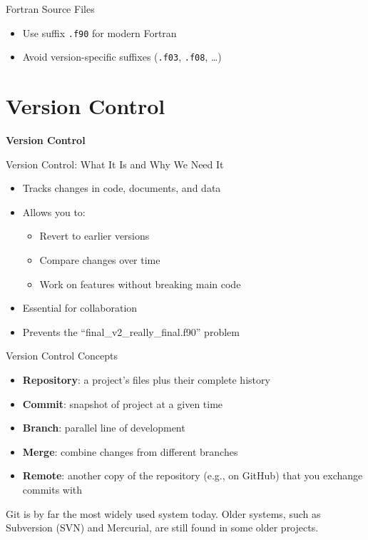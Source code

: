 \begin{frame}{Fortran Source Files}
	\begin{itemize}
		\item Use suffix \texttt{.f90} for modern Fortran
		\item Avoid version-specific suffixes (\texttt{.f03}, \texttt{.f08}, …)
	\end{itemize}
\end{frame}


\section{Version Control}
\begin{frame}
	\centering
	\Huge \textbf{Version Control}
\end{frame}

\begin{frame}{Version Control: What It Is and Why We Need It}
	\begin{itemize}
		\item Tracks changes in code, documents, and data
		\item Allows you to:
		\begin{itemize}
			\item Revert to earlier versions
			\item Compare changes over time
			\item Work on features without breaking main code
		\end{itemize}
		\item Essential for collaboration
		\item Prevents the ``final\_v2\_really\_final.f90'' problem
	\end{itemize}
\end{frame}

\begin{frame}{Version Control Concepts}
	\begin{itemize}
		\item \textbf{Repository}: a project's files plus their complete history
		\item \textbf{Commit}: snapshot of project at a given time
		\item \textbf{Branch}: parallel line of development
		\item \textbf{Merge}: combine changes from different branches
		\item \textbf{Remote}: another copy of the repository (e.g., on GitHub) that you exchange commits with
	\end{itemize}
	\vspace{0.5em}
	Git is by far the most widely used system today. Older systems, such as Subversion (SVN) and Mercurial, are still found in some older projects.
\end{frame}


